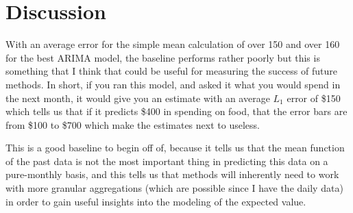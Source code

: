 \documentclass[11pt,a4paper]{article}
\newenvironment{updatematerial}{
\color{blue}
}{

}
\begin{document}

%

\section{Discussion}






\begin{updatematerial}
	With an average error for the simple mean calculation of over 150 and over 160 for the best ARIMA model, the baseline performs rather poorly but this is something that I think that could be useful for measuring the success of future methods. In short, if you ran this model, and asked it what you would spend in the next month, it would give you an estimate with an average $L_1$ error of \$150 which tells us that if it predicts \$400 in spending on food, that the error bars are from \$100 to \$700 which make the estimates next to useless. 
	
	This is a good baseline to begin off of, because it tells us that the mean function of the past data is not the most important thing in predicting this data on a pure-monthly basis, and this tells us that methods will inherently need to work with more granular aggregations (which are possible since I have the daily data) in order to gain useful insights into the modeling of the expected value. 
\end{updatematerial}
\end{document}

